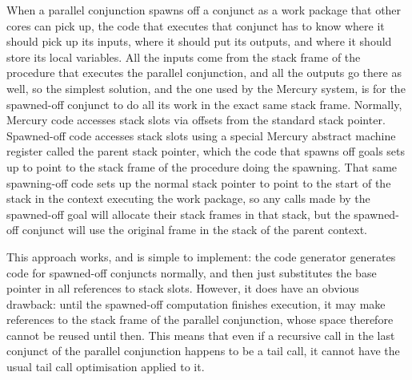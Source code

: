 When a parallel conjunction spawns off a conjunct
as a work package that other cores can pick up,
the code that executes that conjunct has to know
where it should pick up its inputs,
where it should put its outputs,
and where it should store its local variables.
All the inputs come from the stack frame of the procedure
that executes the parallel conjunction,
and all the outputs go there as well,
so the simplest solution, and the one used by the Mercury system,
is for the spawned-off conjunct to do all its work
in the exact same stack frame.
Normally, Mercury code accesses stack slots
via offsets from the standard stack pointer.
Spawned-off code accesses stack slots using
a special Mercury abstract machine register
called the parent stack pointer,
which the code that spawns off goals
sets up to point to the stack frame of the procedure doing the spawning.
That same spawning-off code sets up the normal stack pointer
to point to the start of the stack in the context executing the work package,
so any calls made by the spawned-off goal
will allocate their stack frames in that stack,
but the spawned-off conjunct will use
the original frame in the stack of the parent context.

This approach works, and is simple to implement:
the code generator generates code for spawned-off conjuncts normally,
and then just substitutes the base pointer in all references to stack slots.
However, it does have an obvious drawback:
until the spawned-off computation finishes execution,
it may make references to the stack frame of the parallel conjunction,
whose space therefore cannot be reused until then.
This means that even if
a recursive call in the last conjunct of the parallel conjunction
happens to be a tail call,
it cannot have the usual tail call optimisation applied to it.


